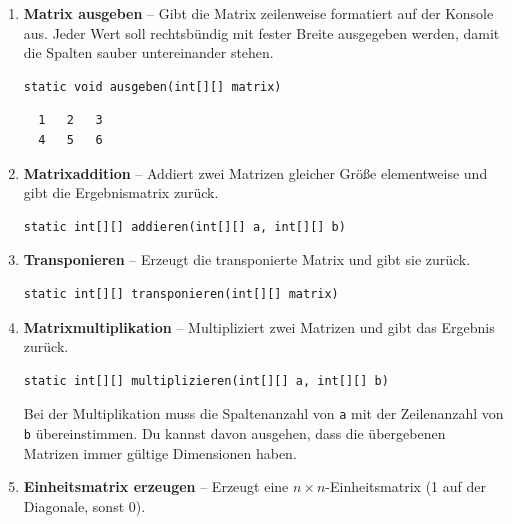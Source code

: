 \documentclass[
	fontsize=12pt,          %
	paper=a4,               %
	numbers=noenddot,       %
	listof=totoc,           %
	listof=entryprefix,     %
	listof=nochaptergap,    %
	bibliography=totoc,     %
	parskip=half            %
	openany                 %
]{scrbook}
\begin{document}
\begin{enumerate}[label=\textbf{\alph*)}]

\item \textbf{Matrix ausgeben} -- Gibt die Matrix zeilenweise formatiert auf der Konsole aus. Jeder Wert soll rechtsbündig mit fester Breite ausgegeben werden, damit die Spalten sauber untereinander stehen.

\begin{lstlisting}
static void ausgeben(int[][] matrix)
\end{lstlisting}

\begin{beispiel}
	\begin{verbatim}
  1   2   3
  4   5   6
	\end{verbatim}
\end{beispiel}

\item \textbf{Matrixaddition} -- Addiert zwei Matrizen gleicher Größe elementweise und gibt die Ergebnismatrix zurück.

\begin{lstlisting}
static int[][] addieren(int[][] a, int[][] b)
\end{lstlisting}

\item \textbf{Transponieren} -- Erzeugt die transponierte Matrix und gibt sie zurück.

\begin{lstlisting}
static int[][] transponieren(int[][] matrix)
\end{lstlisting}

\item \textbf{Matrixmultiplikation} -- Multipliziert zwei Matrizen und gibt das Ergebnis zurück.

\begin{lstlisting}
static int[][] multiplizieren(int[][] a, int[][] b)
\end{lstlisting}

\begin{hinweis}
	Bei der Multiplikation muss die Spaltenanzahl von \texttt{a} mit der Zeilenanzahl von \texttt{b} übereinstimmen. Du kannst davon ausgehen, dass die übergebenen Matrizen immer gültige Dimensionen haben.
\end{hinweis}

\item \textbf{Einheitsmatrix erzeugen} -- Erzeugt eine $n \times n$-Einheitsmatrix (1 auf der Diagonale, sonst 0).


\end{enumerate}
\end{document}
